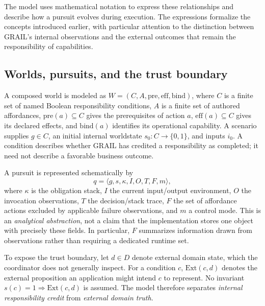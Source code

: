 \documentclass[11pt]{article}
\begin{document}
The model uses mathematical notation to express these relationships and describe how a pursuit evolves during execution. The expressions formalize the concepts introduced earlier, with particular attention to the distinction between GRAIL's internal observations and the external outcomes that remain the responsibility of capabilities.

\subsection{Worlds, pursuits, and the trust boundary}
A composed world is modeled as $W=(C,A,\mathrm{pre},\mathrm{eff},\mathrm{bind})$, where $C$ is a finite set of named Boolean responsibility conditions, $A$ is a finite set of authored affordances, $\mathrm{pre}(a)\subseteq C$ gives the prerequisites of action $a$, $\mathrm{eff}(a)\subseteq C$ gives its declared effects, and $\mathrm{bind}(a)$ identifies its operational capability. A scenario supplies $g\in C$, an initial internal worldstate $s_0:C\rightarrow\{0,1\}$, and inputs $i_0$. A condition describes whether GRAIL has credited a responsibility as completed; it need not describe a favorable business outcome.

A pursuit is represented schematically by
\begin{equation}
q=\langle g,s,\kappa,I,O,T,F,m\rangle,
\label{eq:pursuit}
\end{equation}
where $\kappa$ is the obligation stack, $I$ the current input/output environment, $O$ the invocation observations, $T$ the decision/stack trace, $F$ the set of affordance actions excluded by applicable failure observations, and $m$ a control mode. This is an \emph{analytical abstraction}, not a claim that the implementation stores one object with precisely these fields. In particular, $F$ summarizes information drawn from observations rather than requiring a dedicated runtime set.

To expose the trust boundary, let $d\in D$ denote external domain state, which the coordinator does not generally inspect. For a condition $c$, $\mathrm{Ext}(c,d)$ denotes the external proposition an application might intend $c$ to represent. No invariant $s(c)=1\Rightarrow\mathrm{Ext}(c,d)$ is assumed. The model therefore separates \emph{internal responsibility credit} from \emph{external domain truth}.
\end{document}
